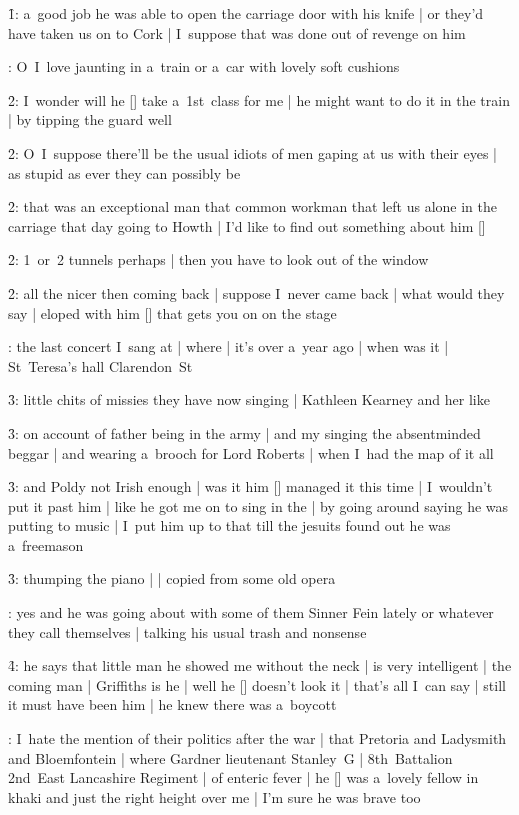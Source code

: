 \f1:
a~good job he was able to open the carriage door with his knife |
or they'd have taken us on to Cork |
I~suppose that was done out of revenge on him

:
O~I~love jaunting in a~train or a~car with lovely soft cushions

\f2:
I~wonder will he [\boylan] take a~1st~class for me |
he might want to do it in the train |
by tipping the guard well

\f2:
O~I~suppose there'll be the usual idiots of men gaping at us with their eyes |
as stupid as ever they can possibly be

\f2:
that was an exceptional man
that common workman that left us alone in the carriage that day going to Howth |
I'd like to find out something about him [\workman]

\f2:
1~or~2 tunnels perhaps |
then you have to look out of the window

\f2:
all the nicer then coming back |
suppose I~never came back |
what would they say |
eloped with him [\boylan] that gets you on on the stage

:
the last concert I~sang at |
where |
it's over a~year ago |
when was it |
St~Teresa's hall Clarendon~St

\f3:
little chits of missies they have now singing |
Kathleen Kearney and her like

\f3:
on account of father being in the army |
and my singing the absentminded beggar |
and wearing a~brooch for Lord Roberts |
when I~had the map of it all

\f3:
and Poldy not Irish enough |
was it him [\bloom] managed it this time |
I~wouldn't put it past him |
like he got me on to sing in the  |
by going around saying he was putting  to music |
I~put him up to that till the jesuits found out he was a~freemason

\f3:
thumping the piano |
 |
copied from some old opera

:
yes and he was going about with some of them Sinner Fein lately
or whatever they call themselves |
talking his usual trash and nonsense

\f4:
he says that little man he showed me without the neck |
is very intelligent |
the coming man |
Griffiths is he |
well he [\griffith] doesn't look it |
that's all I~can say |
still it must have been him |
he knew there was a~boycott

:
I~hate the mention of their politics after the war |
that Pretoria and Lady\-smith and Bloem\-fontein |
where Gardner lieutenant Stanley~G |
8th~Battalion 2nd~East Lanc\-a\-shire Regiment |
of enteric fever |
he [\gardner] was a~lovely fellow in khaki and just the right height over me |
I'm sure he was brave too

